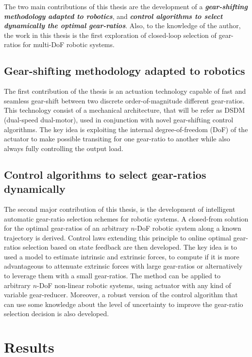 The two main contributions of this thesis are the development of a \emph{\textbf{gear-shifting methodology adapted to robotics}}, and \emph{\textbf{control algorithms to select dynamically the optimal gear-ratios}}. Also, to the knowledge of the author, the work in this thesis is the first exploration of closed-loop selection of gear-ratios for multi-DoF robotic systems. 


\subsection{Gear-shifting methodology adapted to robotics}

The first contribution of the thesis is an actuation technology capable of fast and seamless gear-shift between two discrete order-of-magnitude different gear-ratios. This technology consist of a mechanical architecture, that will be refer as DSDM (dual-speed dual-motor), used in conjunction with novel gear-shifting control algorithms. The key idea is exploiting the internal degree-of-freedom (DoF) of the actuator to make possible transiting for one gear-ratio to another while also always fully controlling the output load. 

\subsection{Control algorithms to select gear-ratios dynamically}

The second major contribution of this thesis, is the development of intelligent automatic gear-ratio selection schemes for robotic systems. A closed-from solution for the optimal gear-ratios of an arbitrary $n$-DoF robotic system along a known trajectory is derived. Control laws extending this principle to online optimal gear-ratios selection based on state feedback are then developed. The key idea is to used a model to estimate intrinsic and extrinsic forces, to compute if it is more advantageous to attenuate extrinsic forces with large gear-ratios or alternatively to leverage them with a small gear-ratios. The method can be applied to arbitrary $n$-DoF non-linear robotic systems, using actuator with any kind of variable gear-reducer. Moreover, a robust version of the control algorithm that can use some knowledge about the level of uncertainty to improve the gear-ratio selection decision is also developed.


\section{Results}
\label{sec:mainresults}

